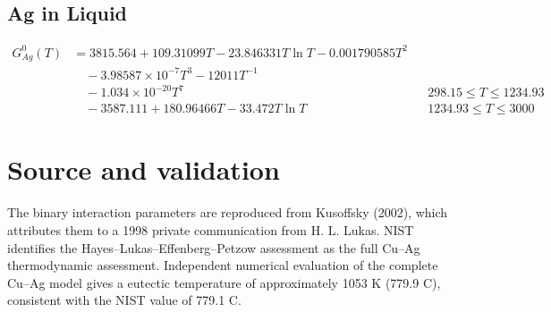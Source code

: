 \documentclass[11pt]{article}
\begin{document}
\subsection*{Ag in Liquid}
\begin{align*}
G^0_{Ag}(T) &= 3815.564 + 109.31099T - 23.846331T\ln T - 0.001790585T^{2}\\[4pt]
&\quad - 3.98587\times 10^{-7}T^{3} - 12011T^{-1}\\[4pt]
&\quad - 1.034\times 10^{-20}T^{7} && 298.15 \le T \le 1234.93\\[4pt]
&\quad - 3587.111 + 180.96466T - 33.472T\ln T && 1234.93 \le T \le 3000
\end{align*}

\section*{Source and validation}
The binary interaction parameters are reproduced from Kusoffsky (2002), which attributes them to a 1998 private communication from H. L. Lukas. NIST identifies the Hayes--Lukas--Effenberg--Petzow assessment as the full Cu--Ag thermodynamic assessment. Independent numerical evaluation of the complete Cu--Ag model gives a eutectic temperature of approximately 1053 K (779.9 C), consistent with the NIST value of 779.1 C.
\end{document}

